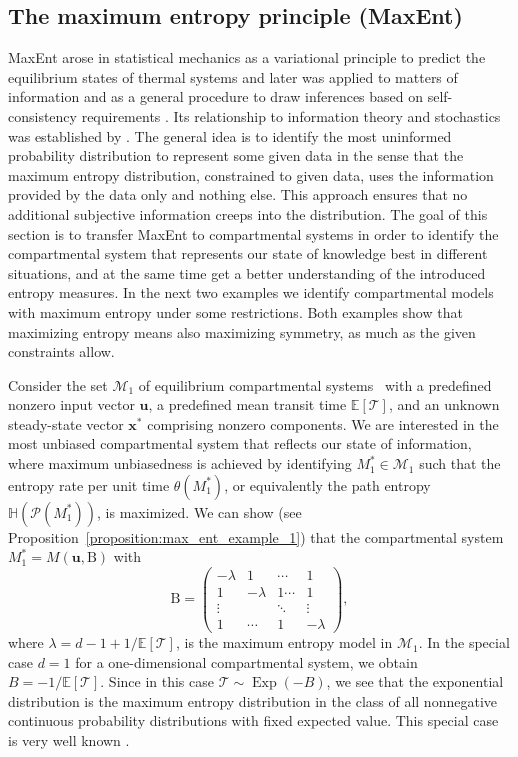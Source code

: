 \documentclass[smallextended]{svjour3}
\makeatletter
\renewcommand*{\eqref}[1]{%
  \hyperref[{#1}]{\textup{\tagform@{\ref*{#1}}}}%
}
\renewcommand{\tens}[1]{\mathrm{#1}}
\renewcommand{\vec}[1]{\mathbf{#1}}
\newcommand{\E}{\mathbb{E}}
\newcommand{\TT}{\mathcal{T}}
\renewcommand{\H}{\mathbb{H}}
\newcommand{\Exp}{\operatorname{Exp}}
\makeatother
\begin{document}
\subsection{The maximum entropy principle (MaxEnt)}
MaxEnt arose in statistical mechanics as a variational principle to predict the equilibrium states of thermal systems and later was applied to matters of information and as a general procedure to draw inferences based on self-consistency requirements \citep{Presse2013RMP}.
Its relationship to information theory and stochastics was established by \citet{Jaynes1957PR1, Jaynes1957PR2}.
The general idea is to identify the most uninformed probability distribution to represent some given data in the sense that the maximum entropy distribution, constrained to given data, uses the information provided by the data only and nothing else.
This approach ensures that no additional subjective information creeps into the distribution.
The goal of this section is to transfer MaxEnt to compartmental systems in order to identify the compartmental system that represents our state of knowledge best in different situations, and at the same time get a better understanding of the introduced entropy measures.
In the next two examples we identify compartmental models with maximum entropy under some restrictions.
Both examples show that maximizing entropy means also maximizing symmetry, as much as the given constraints allow.

\begin{example}
\label{max_ent_example_1}
Consider the set $\mathcal{M}_1$ of equilibrium compartmental systems~\eqref{eqn:lin_CS_sys} with a predefined nonzero input vector $\vec{u}$, a predefined mean transit time $\E\left[\TT\right]$, and an unknown steady-state vector $\vec{x}^\ast$ comprising nonzero components.
We are interested in the most unbiased compartmental system that reflects our state of information, where maximum unbiasedness is achieved by identifying $M^\ast_1\in\mathcal{M}_1$ such that the entropy rate per unit time $\theta(M^\ast_1)$, or equivalently the path entropy $\H(\mathcal{P}(M^\ast_1))$, is maximized. 
We can show (see Proposition~\ref{proposition:max_ent_example_1}) that the compartmental system $M^\ast_1=M(\vec{u},\tens{B})$ with 
\begin{equation}
	\tens{B} = \begin{pmatrix}
    -\lambda & 1 & \cdots & 1\\
		1 & -\lambda & 1 \cdots & 1 \\
		\vdots & & \ddots & \vdots\\
		1 & \cdots & 1 & -\lambda
  \end{pmatrix},
\end{equation}
where $\lambda=d-1+1/\E\left[\TT\right]$, 		
is the maximum entropy model in $\mathcal{M}_1$.
In the special case $d=1$ for a one-dimensional compartmental system, we obtain $B=-1/\E\left[\TT\right]$.
Since in this case $\TT\sim\Exp(-B)$, we see that the exponential distribution is the maximum entropy distribution in the class of all nonnegative continuous probability distributions with fixed expected value.
This special case is very well known \citep[Example~12.2.5]{Cover2006}.
\end{example}
\end{document}
